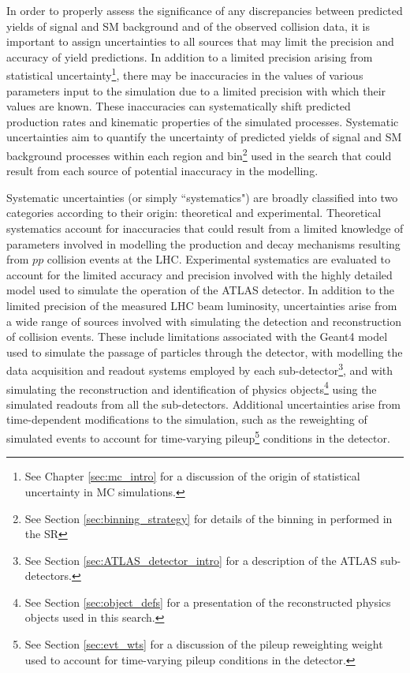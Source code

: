 \label{chapter:systematics}

In order to properly assess the significance of any discrepancies between predicted yields of signal and SM background and of the observed collision data, it is important to assign uncertainties to all sources that may limit the precision and accuracy of yield predictions. In addition to a limited precision arising from statistical uncertainty\footnote{See Chapter \ref{sec:mc_intro} for a discussion of the origin of statistical uncertainty in MC simulations.}, there may be inaccuracies in the values of various parameters input to the simulation due to a limited precision with which their values are known. These inaccuracies can systematically shift predicted production rates and kinematic properties of the simulated processes. Systematic uncertainties aim to quantify the uncertainty of  predicted yields of signal and SM background processes within each region and bin\footnote{See Section \ref{sec:binning_strategy} for details of the binning in \minms performed in the SR} used in the search that could result from each source of potential inaccuracy in the modelling. 

Systematic uncertainties (or simply ``systematics") are broadly classified into two categories according to their origin: theoretical and experimental. Theoretical systematics account for inaccuracies that could result from a limited knowledge of parameters involved in modelling the production and decay mechanisms resulting from \(pp\) collision events at the LHC. Experimental systematics are evaluated to account for the limited accuracy and precision involved with the highly detailed model used to simulate the operation of the ATLAS detector. In addition to the limited precision of the measured LHC beam luminosity, uncertainties arise from a wide range of sources involved with simulating the detection and reconstruction of collision events. These include limitations associated with the Geant4 model \cite{Geant4} used to simulate the passage of particles through the detector, with modelling the data acquisition and readout systems employed by each sub-detector\footnote{See Section \ref{sec:ATLAS_detector_intro} for a description of the ATLAS sub-detectors.}, and with simulating the reconstruction and identification of physics objects\footnote{See Section \ref{sec:object_defs} for a presentation of the reconstructed physics objects used in this search.} using the simulated readouts from all the sub-detectors. Additional uncertainties arise from time-dependent modifications to the simulation, such as the reweighting of simulated events to account for time-varying pileup\footnote{See Section \ref{sec:evt_wts} for a discussion of the pileup reweighting weight used to account for time-varying pileup conditions in the detector.} conditions in the detector.

